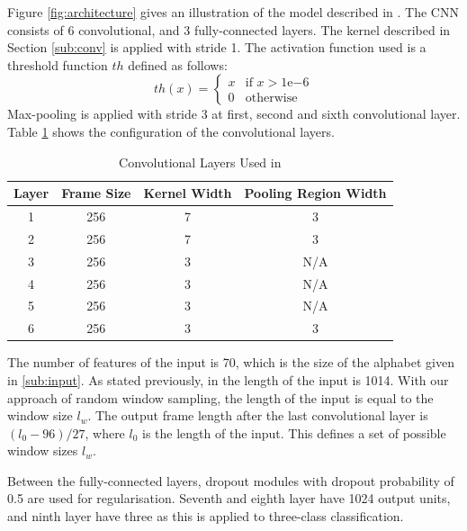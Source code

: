 Figure \ref{fig:architecture} gives an illustration of the model described in \citep{zhang2015character}.
The CNN consists of 6 convolutional, and 3 fully-connected layers.
The kernel described in Section \ref{sub:conv} is applied with stride 1.
The activation function used is a threshold function $th$ defined as follows:
\[
  th(x) =
  \begin{cases}
    x & \text{if $x > 1\mathrm{e}{-6}$} \\
    0 & \text{otherwise}
  \end{cases}
\]
Max-pooling is applied with stride 3 at first, second and sixth convolutional layer.
Table \ref{tab:conv-config} shows the configuration of the convolutional layers.
\begin{table}[t]
\centering
\caption{Convolutional Layers Used in \citep{zhang2015character}}
\label{tab:conv-config}
\begin{tabular}{cccc}
Layer & Frame Size & Kernel Width & Pooling Region Width \\ \hline
1     & 256        & 7            & 3                    \\
2     & 256        & 7            & 3                    \\
3     & 256        & 3            & N/A                  \\
4     & 256        & 3            & N/A                  \\
5     & 256        & 3            & N/A                  \\
6     & 256        & 3            & 3                   
\end{tabular}
\end{table}
The number of features of the input is 70, which is the size of the alphabet given in \ref{sub:input}.
As stated previously, in \citep{zhang2015character} the length of the input is 1014.
With our approach of random window sampling, the length of the input is equal to the window size $l_w$.
The output frame length after the last convolutional layer is $(l_0 - 96) / 27$, where $l_0$ is the length of the input.
This defines a set of possible window sizes $l_w$.

Between the fully-connected layers, dropout modules \citep{hinton2012improving} with dropout probability of 0.5 are used for regularisation.
Seventh and eighth layer have 1024 output units, and ninth layer have three as this is applied to three-class classification.
